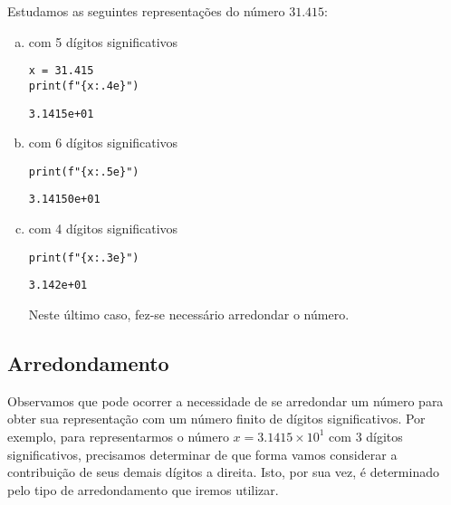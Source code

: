\begin{ex}
  Estudamos as seguintes representações do número $31.415$:
  \begin{enumerate}[a)]
  \item com 5 dígitos significativos

\begin{lstlisting}
x = 31.415
print(f"{x:.4e}")
\end{lstlisting}

\begin{verbatim}
3.1415e+01
\end{verbatim}

  \item com 6 dígitos significativos

\begin{lstlisting}
print(f"{x:.5e}")
\end{lstlisting}

\begin{verbatim}
3.14150e+01
\end{verbatim}

\item com 4 dígitos significativos

\begin{lstlisting}
print(f"{x:.3e}")
\end{lstlisting}

\begin{verbatim}
3.142e+01
\end{verbatim}

Neste último caso, fez-se necessário arredondar o número.
  \end{enumerate}
\end{ex}

\subsection{Arredondamento}

Observamos que pode ocorrer a necessidade de se arredondar um número para obter sua representação com um número finito de dígitos significativos. Por exemplo, para representarmos o número $x=3.1415\times 10^1$ com 3 dígitos significativos, precisamos determinar de que forma vamos considerar a contribuição de seus demais dígitos a direita. Isto, por sua vez, é determinado pelo tipo de arredondamento que iremos utilizar.

